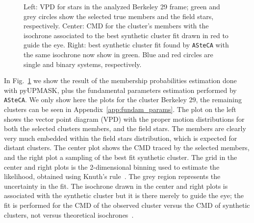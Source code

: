 \documentclass[draft]{aa}
\begin{document}
  \begin{figure}
   \caption{Left: VPD for stars in the analyzed Berkeley 29
    frame; green and grey circles show the selected true members and the field
    stars, respectively.
    Center: CMD for the cluster's members with the isochrone associated to the
    best synthetic cluster fit drawn in red to guide the eye.
    Right: best synthetic cluster fit found by \texttt{ASteCA} with the same
    isochrone now show in green. Blue and red circles are single and binary
    systems, respectively.}
   \label{fig:BER29_fpars}
  \end{figure}

  In Fig.~\ref{fig:BER29_fpars} we show the result of the membership
  probabilities estimation done with pyUPMASK, plus the fundamental parameters
  estimation performed by \texttt{ASteCA}. We only show here the plots for
  the cluster Berkeley 29, the remaining clusters can be seen in
  Appendix~\ref{app:fundam_params}.
  The plot on the left shows the vector point diagram (VPD) with the proper
  motion distributions for both the selected clusters members, and the field
  stars. The members are clearly very much embedded within the field stars
  distribution, which is expected for distant clusters. The center plot shows
  the CMD traced by the selected members, and the right plot a sampling of the
  best fit synthetic cluster. The grid in the center and right plots is
  the 2-dimensional binning used to estimate the likelihood, obtained using
  Knuth's rule~\citep{Knuth_2006}. The grey region represents the uncertainty
  in the fit. The isochrone drawn in the center and right plots is associated
  with the synthetic cluster but it is there merely to guide the eye; the fit is
  performed for the CMD of the observed cluster versus the CMD of synthetic
  clusters, not versus theoretical isochrones~\citep[this is further
  explained in:][]{Perren_2015,Perren_2017,Perren_2020}.\\
\end{document}

